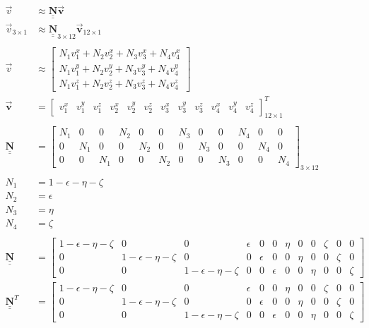 \documentclass[12pt]{article}
\def\doubleunderline#1{\underline{\underline{#1}}}
\newcommand{\vv}{\vec{v}}
\newcommand{\vb}{\vec{\mathbf{v}}}
\newcommand{\nb}{\doubleunderline{\mathbf{N}}}
\begin{document}
\begin{align*}
\vv &\approx \nb \vb \\
\vv_{3 \times 1} & \approx \nb_{3 \times 12} \vb_{12 \times 1}
\\ \\
\vv &\approx	\begin{bmatrix} 
	N_1v^{x}_{1} +  N_2v^{x}_{2} +  N_3v^{x}_{3} +  N_4v^{x}_{4} \\
	N_1v^{y}_{1} +  N_2v^{y}_{2} +  N_3v^{y}_{3} +  N_4v^{y}_{4} \\
	N_1v^{z}_{1} +  N_2v^{z}_{2} +  N_3v^{z}_{3} +  N_4v^{z}_{4}
 \end{bmatrix}
\\
\vb & =
\begin{bmatrix}
	v_{1}^{x} & v_{1}^{y} & v_{1}^{z} &  v_{2}^{x} & v_{2}^{y} & v_{2}^{z} &  v_{3}^{x} & v_{3}^{y} & v_{3}^{z} &  v_{4}^{x} & v_{4}^{y} & v_{4}^{z}
\end{bmatrix}^{T}_{12 \times 1}
\\ \\
\nb &=
\begin{bmatrix}
	N_1 & 0 & 0 &  N_2 & 0 & 0 &  N_3 & 0 & 0 &  N_4 & 0 & 0 \\
	0 & N_1 & 0 & 0 &  N_2 & 0 & 0 &  N_3 & 0 & 0 &  N_4 & 0 \\
	0 & 0 & N_1 & 0 & 0 &  N_2 & 0 & 0 &  N_3 & 0 & 0 &  N_4
\end{bmatrix}_{3 \times 12} \\
\\
N_1 &= 1 - \epsilon - \eta - \zeta \\
N_2 &= \epsilon \\
N_3 &= \eta \\
N_4 &= \zeta \\
\\
\nb &=
\begin{bmatrix}
	1 - \epsilon - \eta - \zeta & 0 & 0 &  \epsilon & 0 & 0 &  \eta & 0 & 0 &  \zeta & 0 & 0 \\
	0 & 1 - \epsilon - \eta - \zeta & 0 & 0 &  \epsilon & 0 & 0 &  \eta & 0 & 0 &  \zeta & 0 \\
	0 & 0 & 1 - \epsilon - \eta - \zeta & 0 & 0 &  \epsilon & 0 & 0 &  \eta & 0 & 0 &  \zeta
\end{bmatrix}
\\
\nb^{T} &=
\begin{bmatrix}
	1 - \epsilon - \eta - \zeta & 0 & 0 &  \epsilon & 0 & 0 &  \eta & 0 & 0 &  \zeta & 0 & 0 \\
	0 & 1 - \epsilon - \eta - \zeta & 0 & 0 &  \epsilon & 0 & 0 &  \eta & 0 & 0 &  \zeta & 0 \\
	0 & 0 & 1 - \epsilon - \eta - \zeta & 0 & 0 &  \epsilon & 0 & 0 &  \eta & 0 & 0 &  \zeta
\end{bmatrix}
\end{align*}
\end{document}
